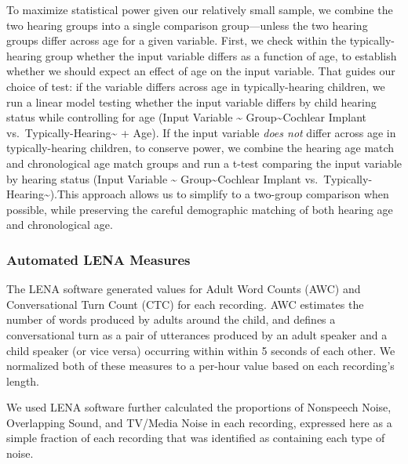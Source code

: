 \documentclass[
  man,floatsintext]{apa6}
\begin{document}
To maximize statistical power given our relatively small sample, we combine the two hearing groups into a single comparison group---unless the two hearing groups differ across age for a given variable. First, we check within the typically-hearing group whether the input variable differs as a function of age, to establish whether we should expect an effect of age on the input variable. That guides our choice of test: if the variable differs across age in typically-hearing children, we run a linear model testing whether the input variable differs by child hearing status while controlling for age (Input Variable \textasciitilde{} Group\textasciitilde Cochlear Implant vs.~Typically-Hearing\textasciitilde{} + Age). If the input variable \emph{does not} differ across age in typically-hearing children, to conserve power, we combine the hearing age match and chronological age match groups and run a t-test comparing the input variable by hearing status (Input Variable \textasciitilde{} Group\textasciitilde Cochlear Implant vs.~Typically-Hearing\textasciitilde).This approach allows us to simplify to a two-group comparison when possible, while preserving the careful demographic matching of both hearing age and chronological age.

\subsubsection{Automated LENA Measures}\label{automated-lena-measures}

The LENA software generated values for Adult Word Counts (AWC) and Conversational Turn Count (CTC) for each recording. AWC estimates the number of words produced by adults around the child, and defines a conversational turn as a pair of utterances produced by an adult speaker and a child speaker (or vice versa) occurring within within 5 seconds of each other. We normalized both of these measures to a per-hour value based on each recording's length.

We used LENA software further calculated the proportions of Nonspeech Noise, Overlapping Sound, and TV/Media Noise in each recording, expressed here as a simple fraction of each recording that was identified as containing each type of noise.
\end{document}
